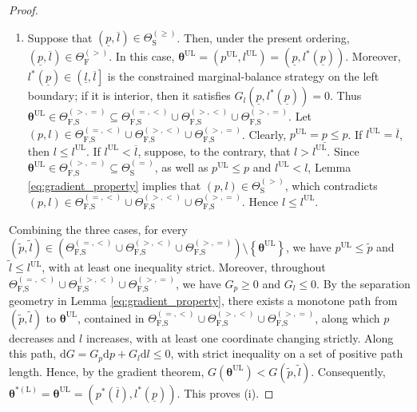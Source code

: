 \documentclass[a4paper,12pt]{article}
\begin{document}
\begin{proof}
\begin{enumerate}
\item[(III)] Suppose that $\left(\underline{p},\overline{l}\right)\in\Theta_{\text{S}}^{\left(\geq\right)}$. Then, under the present ordering, $\left(\underline{p},\overline{l}\right)\in\Theta_{\text{F}}^{\left(>\right)}$. In this case, ${\bm\theta}^{\text{UL}}=\left(p^{\text{UL}},l^{\text{UL}}\right)=\left(\underline{p},l^*\left(\underline{p}\right)\right)$. Moreover, $l^*\left(\underline{p}\right)\in\left(\underline{l},\overline{l}\right]$ is the constrained marginal-balance strategy on the left boundary; if it is interior, then it satisfies $G_l\left(\underline{p},l^*\left(\underline{p}\right)\right)=0$. Thus ${\bm\theta}^{\text{UL}}\in\Theta_{\text{F,S}}^{\left(>,=\right)}\subseteq\Theta_{\text{F,S}}^{\left(=,<\right)}\cup\Theta_{\text{F,S}}^{\left(>,<\right)}\cup\Theta_{\text{F,S}}^{\left(>,=\right)}$. Let $\left(p,l\right)\in\Theta_{\text{F,S}}^{\left(=,<\right)}\cup\Theta_{\text{F,S}}^{\left(>,<\right)}\cup\Theta_{\text{F,S}}^{\left(>,=\right)}$. Clearly, $p^{\text{UL}}=\underline{p}\leq p$. If $l^{\text{UL}}=\overline{l}$, then $l\leq l^{\text{UL}}$. If $l^{\text{UL}}<\overline{l}$, suppose, to the contrary, that $l>l^{\text{UL}}$. Since ${\bm\theta}^{\text{UL}}\in\Theta_{\text{F,S}}^{\left(>,=\right)}\subseteq\Theta_{\text{S}}^{\left(=\right)}$, as well as $p^{\text{UL}}\leq p$ and $l^{\text{UL}}<l$, Lemma \ref{eq:gradient_property} implies that $\left(p,l\right)\in\Theta_{\text{S}}^{\left(>\right)}$, which contradicts $\left(p,l\right)\in\Theta_{\text{F,S}}^{\left(=,<\right)}\cup\Theta_{\text{F,S}}^{\left(>,<\right)}\cup\Theta_{\text{F,S}}^{\left(>,=\right)}$. Hence $l\leq l^{\text{UL}}$.
\end{enumerate}

Combining the three cases, for every $\left(\tilde{p},\tilde{l}\right)\in\left(\Theta_{\text{F,S}}^{\left(=,<\right)}\cup\Theta_{\text{F,S}}^{\left(>,<\right)}\cup\Theta_{\text{F,S}}^{\left(>,=\right)}\right)\setminus\left\{{\bm\theta}^{\text{UL}}\right\}$, we have $p^{\text{UL}}\leq\tilde{p}$ and $\tilde{l}\leq l^{\text{UL}}$, with at least one inequality strict. Moreover, throughout $\Theta_{\text{F,S}}^{\left(=,<\right)}\cup\Theta_{\text{F,S}}^{\left(>,<\right)}\cup\Theta_{\text{F,S}}^{\left(>,=\right)}$, we have $G_p\geq 0$ and $G_l\leq 0$. By the separation geometry in Lemma \ref{eq:gradient_property}, there exists a monotone path from $\left(\tilde{p},\tilde{l}\right)$ to ${\bm\theta}^{\text{UL}}$, contained in $\Theta_{\text{F,S}}^{\left(=,<\right)}\cup\Theta_{\text{F,S}}^{\left(>,<\right)}\cup\Theta_{\text{F,S}}^{\left(>,=\right)}$, along which $p$ decreases and $l$ increases, with at least one coordinate changing strictly. Along this path, $\text{d}G=G_p\text{d}p+G_l\text{d}l\leq 0$, with strict inequality on a set of positive path length. Hence, by the gradient theorem, $G\left({\bm\theta}^{\text{UL}}\right)<G\left(\tilde{p},\tilde{l}\right)$. Consequently, ${\bm\theta}^{*\left(\text{L}\right)}={\bm\theta}^{\text{UL}}=\left(p^*\left(\overline{l}\right),l^*\left(\underline{p}\right)\right)$. This proves (i).


\end{proof}
\end{document}

